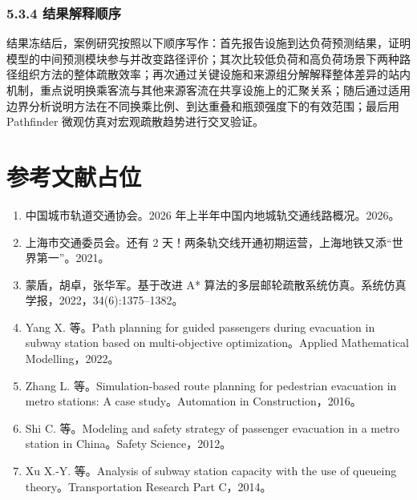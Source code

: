 \documentclass[UTF8,a4paper,12pt]{ctexart}
\begin{document}
\subsubsection{5.3.4 结果解释顺序}

结果冻结后，案例研究按照以下顺序写作：首先报告设施到达负荷预测结果，证明模型的中间预测模块参与并改变路径评价；其次比较低负荷和高负荷场景下两种路径组织方法的整体疏散效率；再次通过关键设施和来源组分解解释整体差异的站内机制，重点说明换乘客流与其他来源客流在共享设施上的汇聚关系；随后通过适用边界分析说明方法在不同换乘比例、到达重叠和瓶颈强度下的有效范围；最后用 Pathfinder 微观仿真对宏观疏散趋势进行交叉验证。

\section*{参考文献占位}

\begin{enumerate}
    \item 中国城市轨道交通协会。2026 年上半年中国内地城轨交通线路概况。2026。
    \item 上海市交通委员会。还有 2 天！两条轨交线开通初期运营，上海地铁又添“世界第一”。2021。
    \item 蒙盾，胡卓，张华军。基于改进 A* 算法的多层邮轮疏散系统仿真。系统仿真学报，2022，34(6):1375--1382。
    \item Yang X. 等。Path planning for guided passengers during evacuation in subway station based on multi-objective optimization。Applied Mathematical Modelling，2022。
    \item Zhang L. 等。Simulation-based route planning for pedestrian evacuation in metro stations: A case study。Automation in Construction，2016。
    \item Shi C. 等。Modeling and safety strategy of passenger evacuation in a metro station in China。Safety Science，2012。
    \item Xu X.-Y. 等。Analysis of subway station capacity with the use of queueing theory。Transportation Research Part C，2014。
\end{enumerate}
\end{document}

